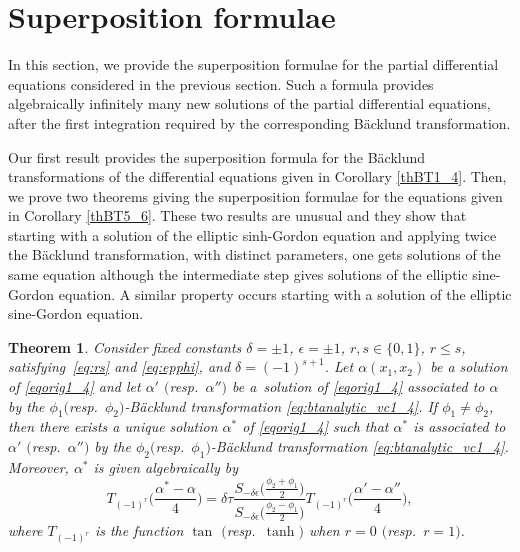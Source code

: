 \documentclass[pdftex]{sigma}
\numberwithin{equation}{section}
\newtheorem{Theorem}{Theorem}[section]
\begin{document}
\section{Superposition formulae} \label{Superposition}
In this section, we provide the superposition formulae for the partial differential equations considered in the previous section. Such a formula provides algebraically infinitely many new solutions of the partial differential equations, after the first integration required by the corresponding B\"acklund transformation.

Our first result provides the superposition formula for the B\"acklund transformations of the differential equations given in Corollary \ref{thBT1_4}. Then, we prove two theorems giving the superposition formulae for the equations given in Corollary \ref{thBT5_6}.
These two results are unusual and they show that starting with a solution of the elliptic sinh-Gordon equation and applying twice the B\"acklund transformation, with distinct parameters, one gets solutions of the same equation although the intermediate step gives solutions of the elliptic sine-Gordon equation. A similar property occurs starting with a solution of
 the elliptic sine-Gordon equation.


\begin{Theorem}\label{th:superth1_4}
 Consider fixed constants $\delta=\pm 1$, $\epsilon=\pm 1$,
$r,s\in \{0,1\}$, $r\leq s$, satisfying~\eqref{eq:rs} and \eqref{eq:epphi}, and $\delta=(-1)^{s+1}$. Let $\alpha(x_1,x_2)$ be a solution of \eqref{eqorig1_4} and
 let $\alpha'$ $($resp.\ $\alpha'')$ be a~solution of \eqref{eqorig1_4}
 associated to $\alpha$ by the $\phi_1($resp.\ $\phi_2)$-B\"acklund transformation \eqref{eq:btanalytic_vc1_4}.
 If $\phi_1\neq \phi_2$, then there exists a unique solution $\alpha^*$ of
 \eqref{eqorig1_4} such that $\alpha^*$ is associated to $\alpha'$ $($resp.~$\alpha'')$ by the $\phi_2($resp.\ $\phi_1)$-B\"acklund transformation \eqref{eq:btanalytic_vc1_4}. Moreover, $\alpha^*$ is
given algebraically by
\begin{equation}\label{eq:superpos}
T_{(-1)^r}\biggl(\frac{\alpha^*-\alpha}{4}\biggr) =
\delta\tau \frac{S_{-\delta\epsilon}\bigl(\frac{\phi_2+\phi_1}{2}\bigr) } {S_{-\delta\epsilon}\bigl(\frac{\phi_2-\phi_1}{2}\bigr)}
T_{(-1)^r}\biggl(\frac{\alpha'-\alpha''}{4}\biggr),
\end{equation}
where $T_{(-1)^r}$ is the function $\tan$ $($resp.\ $\tanh)$ when $r=0$ $($resp.\ $r=1)$.
\end{Theorem}
\end{document}
